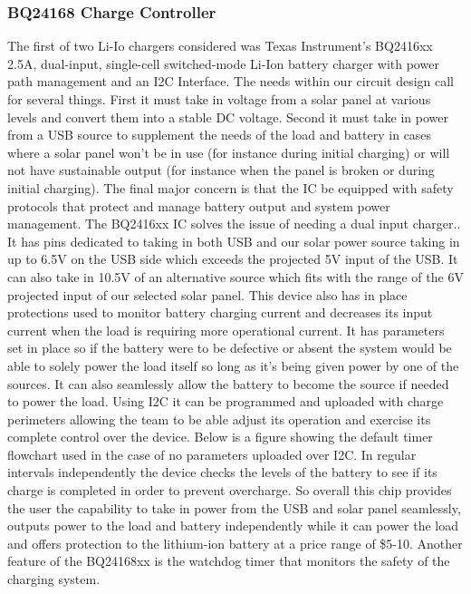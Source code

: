\subsubsection{BQ24168 Charge Controller}
The first of two Li-Io chargers considered was Texas Instrument's BQ2416xx 2.5A, dual-input, single-cell switched-mode Li-Ion battery charger with power path management and an I2C Interface. The needs within our circuit design call for several things. First it must take in voltage from a solar panel at various levels and convert them into a stable DC voltage. Second it must take in power from a USB source to supplement the needs of the load and battery in cases where a solar panel won't be in use (for instance during initial charging) or will not have sustainable output (for instance when the panel is broken or during initial charging). The final major concern is that the IC be equipped with safety protocols that protect and manage battery output and system power management. The BQ2416xx IC solves the issue of needing a dual input charger.. It has pins dedicated to taking in both USB and our solar power source taking in up to 6.5V on the USB side which exceeds the projected 5V input of the USB. It can also take in 10.5V of an alternative source which fits with the range of the 6V projected input of our selected solar panel. This device also has in place protections used to monitor battery charging current and decreases its input current when the load is requiring more operational current. It has parameters set in place so if the battery were to be defective or absent the system would be able to solely power the load itself so long as it's being given power by one of the sources. It can also seamlessly allow the battery to become the source if needed to power the load. Using I2C it can be programmed and uploaded with charge perimeters allowing the team to be able adjust its operation and exercise its complete control over the device. Below is a figure showing the default timer flowchart used in the case of no parameters uploaded over I2C. In regular intervals independently the device checks the levels of the battery to see if its charge is completed in order to prevent overcharge. So overall this chip provides the user the capability to take in power from the USB and solar panel seamlessly, outputs power to the load and battery independently while it can power the load and offers protection to the lithium-ion battery at a price range of \$5-10. Another feature of the BQ24168xx is the watchdog timer that monitors the safety of the charging system. 

